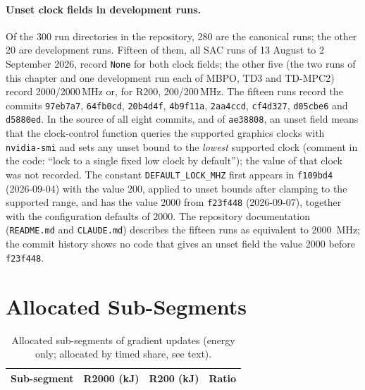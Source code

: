 \paragraph{Unset clock fields in development runs.}
Of the \num{300} run directories in the repository, \num{280} are the canonical runs; the other \num{20} are development runs.
Fifteen of them, all SAC runs of 13 August to 2 September 2026, record \texttt{None} for both clock fields; the other five (the two runs of this chapter and one development run each of MBPO, TD3 and TD-MPC2) record \num{2000}/\num{2000}\,MHz or, for R200, \num{200}/\num{200}\,MHz.
The fifteen runs record the commits \texttt{97eb7a7}, \texttt{64fb0cd}, \texttt{20b4d4f}, \texttt{4b9f11a}, \texttt{2aa4ccd}, \texttt{cf4d327}, \texttt{d05cbe6} and \texttt{d5880ed}.
In the source of all eight commits, and of \texttt{ae38808}, an unset field means that the clock-control function queries the supported graphics clocks with \texttt{nvidia-smi} and sets any unset bound to the \emph{lowest} supported clock (comment in the code: ``lock to a single fixed low clock by default''); the value of that clock was not recorded.
The constant \texttt{DEFAULT\_LOCK\_MHZ} first appears in \texttt{f109bd4} (2026-09-04) with the value \num{200}, applied to unset bounds after clamping to the supported range, and has the value \num{2000} from \texttt{f23f448} (2026-09-07), together with the configuration defaults of \num{2000}.
The repository documentation (\texttt{README.md} and \texttt{CLAUDE.md}) describes the fifteen runs as equivalent to \SI{2000}{\mega\hertz}; the commit history shows no code that gives an unset field the value \num{2000} before \texttt{f23f448}.

\section{Allocated Sub-Segments}
\label{app:clock-suballoc}

\begin{table}[tbp]
  \centering
  \caption{Allocated sub-segments of gradient updates (energy only; allocated by timed share, see text).}
  \label{tab:app-clock-suballoc}
  \begin{tabular}{lrrr}
    \toprule
    Sub-segment                 & R2000 (kJ) & R200 (kJ) & Ratio \\
    \midrule
    \bottomrule
  \end{tabular}
\end{table}

